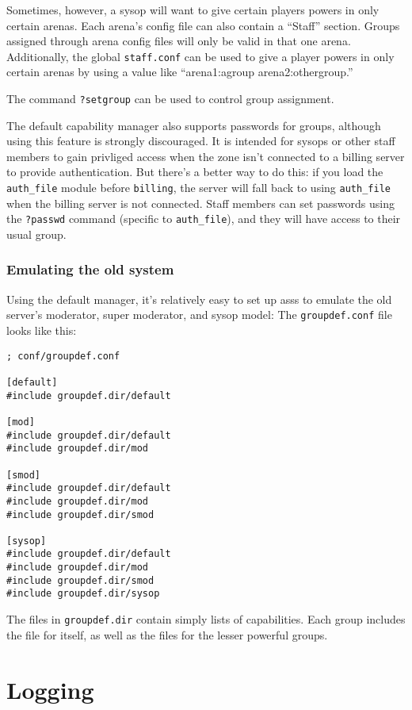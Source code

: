 \documentclass{article}
\newcommand{\asss}{asss}
\begin{document}
Sometimes, however, a sysop will want to give certain players powers in
only certain arenas. Each arena's config file can also contain a
``Staff'' section. Groups assigned through arena config files will only
be valid in that one arena. Additionally, the global \verb/staff.conf/
can be used to give a player powers in only certain arenas by using a
value like ``arena1:agroup arena2:othergroup.''

The command \verb/?setgroup/ can be used to control group assignment.

The default capability manager also supports passwords for groups,
although using this feature is strongly discouraged. It is intended for
sysops or other staff members to gain privliged access when the zone
isn't connected to a billing server to provide authentication. But
there's a better way to do this: if you load the \verb/auth_file/ module
before \verb/billing/, the server will fall back to using
\verb/auth_file/ when the billing server is not connected. Staff members
can set passwords using the \verb/?passwd/ command (specific to
\verb/auth_file/), and they will have access to their usual group.


\subsubsection{Emulating the old system}
Using the default manager, it's relatively easy to set up \asss{} to
emulate the old server's moderator, super moderator, and sysop model:
The \verb/groupdef.conf/ file looks like this:

\begin{verbatim}
; conf/groupdef.conf

[default]
#include groupdef.dir/default

[mod]
#include groupdef.dir/default
#include groupdef.dir/mod

[smod]
#include groupdef.dir/default
#include groupdef.dir/mod
#include groupdef.dir/smod

[sysop]
#include groupdef.dir/default
#include groupdef.dir/mod
#include groupdef.dir/smod
#include groupdef.dir/sysop
\end{verbatim}

The files in \verb/groupdef.dir/ contain simply lists of capabilities.
Each group includes the file for itself, as well as the files for the
lesser powerful groups.


\section{Logging}
\end{document}

